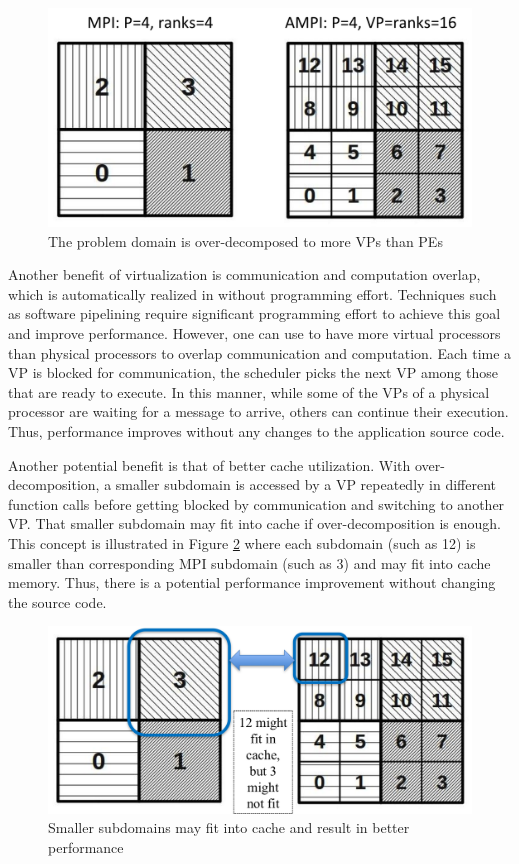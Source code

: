 \documentclass[10pt]{article}
\begin{document}
\begin{figure}[h]
\centering
\includegraphics[width=4.6in]{figs/prac.png}
\caption{The problem domain is over-decomposed to more VPs than PEs}
\label{fig_prac}
\end{figure}

Another benefit of virtualization is communication and computation overlap, which
is automatically realized in \ampi{} without programming effort.
Techniques such as software pipelining require significant programming
effort to achieve this goal and improve performance. However, one can use \ampi{}
to have more virtual processors than physical processors to overlap communication
and computation. Each time a VP is blocked for communication, the \charmpp{}
scheduler picks the next VP among those that are ready to execute. In this
manner, while some of the VPs of a physical processor are waiting for a message
to arrive, others can continue their execution. Thus, performance improves
without any changes to the application source code.

Another potential benefit is that of better cache utilization. With
over-decomposition, a smaller subdomain is accessed by a VP repeatedly
in different function calls before getting blocked by communication and
switching to another VP. That smaller subdomain may fit into cache if
over-decomposition is enough. This concept is illustrated in Figure
\ref{fig_cache} where each \ampi{} subdomain (such as 12) is smaller than
corresponding MPI subdomain (such as 3) and may fit into cache memory. Thus,
there is a potential performance improvement without changing the source code.

\begin{figure}[h]
\centering
\includegraphics[width=4.6in]{figs/cache.png}
\caption{Smaller subdomains may fit into cache and result in better performance}
\label{fig_cache}
\end{figure}
\end{document}

